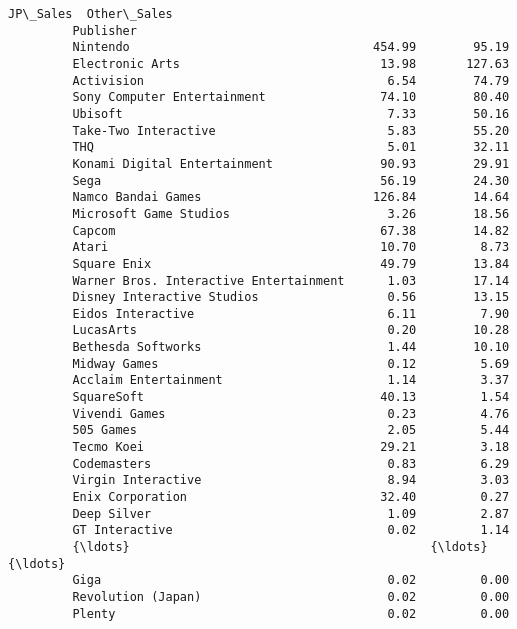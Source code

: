 \documentclass[11pt]{article}
\begin{document}
\begin{Verbatim}[commandchars=\\\{\}]
                                                 JP\_Sales  Other\_Sales  
         Publisher                                                      
         Nintendo                                  454.99        95.19  
         Electronic Arts                            13.98       127.63  
         Activision                                  6.54        74.79  
         Sony Computer Entertainment                74.10        80.40  
         Ubisoft                                     7.33        50.16  
         Take-Two Interactive                        5.83        55.20  
         THQ                                         5.01        32.11  
         Konami Digital Entertainment               90.93        29.91  
         Sega                                       56.19        24.30  
         Namco Bandai Games                        126.84        14.64  
         Microsoft Game Studios                      3.26        18.56  
         Capcom                                     67.38        14.82  
         Atari                                      10.70         8.73  
         Square Enix                                49.79        13.84  
         Warner Bros. Interactive Entertainment      1.03        17.14  
         Disney Interactive Studios                  0.56        13.15  
         Eidos Interactive                           6.11         7.90  
         LucasArts                                   0.20        10.28  
         Bethesda Softworks                          1.44        10.10  
         Midway Games                                0.12         5.69  
         Acclaim Entertainment                       1.14         3.37  
         SquareSoft                                 40.13         1.54  
         Vivendi Games                               0.23         4.76  
         505 Games                                   2.05         5.44  
         Tecmo Koei                                 29.21         3.18  
         Codemasters                                 0.83         6.29  
         Virgin Interactive                          8.94         3.03  
         Enix Corporation                           32.40         0.27  
         Deep Silver                                 1.09         2.87  
         GT Interactive                              0.02         1.14  
         {\ldots}                                          {\ldots}          {\ldots}  
         Giga                                        0.02         0.00  
         Revolution (Japan)                          0.02         0.00  
         Plenty                                      0.02         0.00  

\end{Verbatim}
\end{document}
